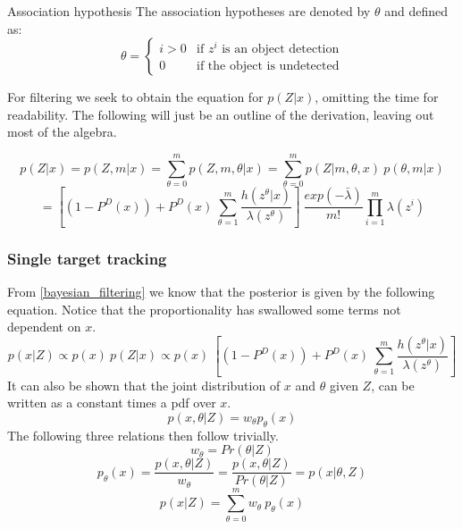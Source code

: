 \begin{definition}{Association hypothesis}
The association hypotheses are denoted by $\theta$ and defined as:
\begin{equation}
    \theta = 
    \begin{cases}
        i > 0 & \text{if $z^i$ is an object detection} \\
        0 & \text{if the object is undetected}
    \end{cases}
\end{equation}
\end{definition}

For filtering we seek to obtain the equation for $p(Z \vert x)$, omitting the time for readability. The following will just be an outline of the derivation, leaving out most of the algebra.

\begin{equation*}
    p(Z \vert x) = p(Z, m \vert x) = \sum_{\theta = 0}^{m} p(Z, m, \theta \vert x) = \sum_{\theta = 0}^{m} p(Z \vert m, \theta, x) \: p(\theta, m \vert x)
\end{equation*}
\begin{equation}
    = \left[ (1 - P^D(x)) + P^D(x) \: \sum_{\theta = 1}^{m} \frac{h(z^\theta \vert x)}{\lambda(z^\theta)} \right] \: \frac{exp(-\bar{\lambda})}{m!} \prod_{i = 1}^{m} \lambda(z^i)
\end{equation}

\subsubsection{Single target tracking}
From \ref{bayesian_filtering} we know that the posterior is given by the following equation. Notice that the proportionality has swallowed some terms not dependent on $x$.
\begin{equation}
    \label{eq:mes_mod}
    p(x \vert Z) \propto p(x) \: p(Z \vert x) \propto p(x) \: \left[ (1 - P^D(x)) + P^D(x) \: \sum_{\theta = 1}^{m} \frac{h(z^\theta \vert x)}{\lambda(z^\theta)} \right]
\end{equation}
It can also be shown that the joint distribution of $x$ and $\theta$ given $Z$, can be written as a constant times a pdf over $x$.
\begin{equation*}
    p(x, \theta \vert Z) = w_\theta p_\theta(x)
\end{equation*}
The following three relations then follow trivially.
\begin{equation*}
    w_\theta = Pr(\theta \vert Z)
\end{equation*}
\begin{equation*}
    p_\theta(x) = \frac{p(x, \theta \vert Z)}{w_\theta} = \frac{p(x, \theta \vert Z)}{Pr(\theta \vert Z)} = p(x \vert \theta, Z)
\end{equation*}
\begin{equation}
    \label{eq:also_mes_mod}
    p(x \vert Z) = \sum_{\theta = 0}^{m} w_\theta \: p_\theta(x)
\end{equation}

